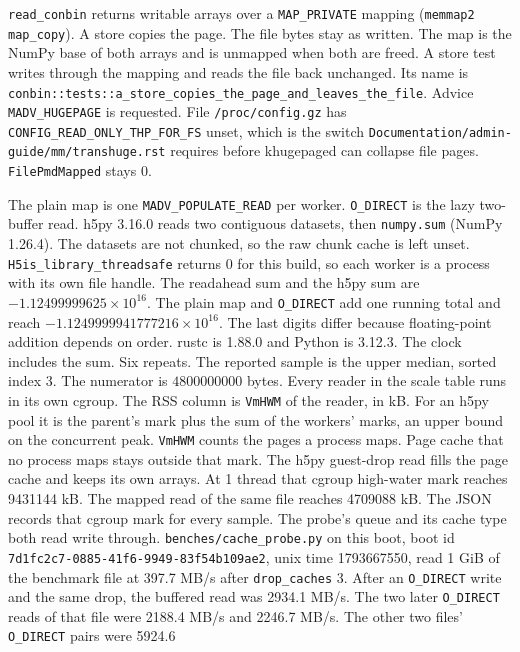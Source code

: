 \texttt{read\_conbin} returns writable arrays over a
\texttt{MAP\_PRIVATE} mapping (\texttt{memmap2} \texttt{map\_copy}).
A store copies the page.
The file bytes stay as written.
The map is the NumPy base of both arrays and is unmapped when both are
freed.
A store test writes through the mapping and reads the file back
unchanged.
Its name is
\texttt{conbin::tests::a\_store\_copies\_the\_page\_and\_leaves\_the\_file}.
Advice \texttt{MADV\_HUGEPAGE} is requested.
File \texttt{/proc/config.gz} has
\texttt{CONFIG\_READ\_ONLY\_THP\_FOR\_FS} unset, which is the switch
\texttt{Documentation/admin-guide/mm/transhuge.rst} requires before
khugepaged can collapse file pages.
\texttt{FilePmdMapped} stays 0.

The plain map is one \texttt{MADV\_POPULATE\_READ} per worker.
\texttt{O\_DIRECT} is the lazy two-buffer read.
h5py 3.16.0 reads two contiguous datasets, then \texttt{numpy.sum}
(NumPy 1.26.4).
The datasets are not chunked, so the raw chunk cache is left unset.
\texttt{H5is\_library\_threadsafe} returns 0 for this build, so each
worker is a process with its own file handle.
The readahead sum and the h5py sum are
\(-1.12499999625 \times 10^{16}\).
The plain map and \texttt{O\_DIRECT} add one running total and reach
\(-1.1249999941777216 \times 10^{16}\).
The last digits differ because floating-point addition depends on order.
rustc is 1.88.0 and Python is 3.12.3.
The clock includes the sum.
Six repeats.
The reported sample is the upper median, sorted index 3.
The numerator is \(4800000000\) bytes.
Every reader in the scale table runs in its own cgroup.
The RSS column is \texttt{VmHWM} of the reader, in kB.
For an h5py pool it is the parent's mark plus the sum of the workers'
marks, an upper bound on the concurrent peak.
\texttt{VmHWM} counts the pages a process maps.
Page cache that no process maps stays outside that mark.
The h5py guest-drop read fills the page cache and keeps its own arrays.
At 1 thread that cgroup high-water mark reaches 9431144 kB.
The mapped read of the same file reaches 4709088 kB.
The JSON records that cgroup mark for every sample.
The probe's queue and its cache type both read write through.
\texttt{benches/cache\_probe.py} on this boot, boot id
\texttt{7d1fc2c7-0885-41f6-9949-83f54b109ae2}, unix time 1793667550,
read 1 GiB of the benchmark file at 397.7 MB/s after
\texttt{drop\_caches} 3.
After an \texttt{O\_DIRECT} write and the same drop, the buffered read
was 2934.1 MB/s.
The two later \texttt{O\_DIRECT} reads of that file were 2188.4
MB/s and 2246.7 MB/s.
The other two files' \texttt{O\_DIRECT} pairs were 5924.6
